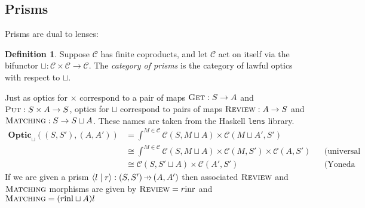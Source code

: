 \documentclass[11pt,a4paper]{article}
\theoremstyle{plain}
\theoremstyle{definition}
\newtheorem{definition}[theorem]{Definition}
\newtheorem{example}[theorem]{Example}
\newcommand{\C}{\mathscr{C}}
\newcommand{\lenslib}{\texttt{lens}}
\newcommand{\Optic}{\mathbf{Optic}}
\newcommand{\inl}{\mathrm{inl}}
\newcommand{\inr}{\mathrm{inr}}
\newcommand{\rep}[2]{{\ensuremath \left\langle #1 \mid #2 \right\rangle}}
\newcommand{\fget}{\textsc{Get}}
\newcommand{\fput}{\textsc{Put}}
\newcommand{\freview}{\textsc{Review}}
\newcommand{\fmatching}{\textsc{Matching}}
\newcommand{\hto}{\ensuremath{\,\mathaccent\shortmid\rightarrow\,}}
\begin{document}

\subsection{Prisms}
Prisms are dual to lenses:

\begin{definition}
  Suppose $\C$ has finite coproducts, and let $\C$ act on itself via the bifunctor $\sqcup : \C \times \C \to \C$. The \emph{category of prisms} is the category of lawful optics with respect to $\sqcup$.
\end{definition}

Just as optics for $\times$ correspond to a pair of maps $\fget : S \to A$ and $\fput : S \times A \to S$, optics for $\sqcup$ correspond to pairs of maps $\freview : A \to S$ and $\fmatching : S \to S \sqcup A$. These names are taken from the Haskell \lenslib{} library.
\begin{align*}
  \Optic_\sqcup((S, S'), (A, A')) &= \int^{M \in \C} \C(S, M \sqcup A) \times \C(M \sqcup A', S') \\
                                  &\cong \int^{M \in \C} \C(S, M \sqcup A) \times \C(M, S') \times \C(A, S') && \text{(universal property of coproduct)} \\
                                  &\cong \C(S, S' \sqcup A) \times \C(A', S') && \text{(Yoneda reduction)}
\end{align*}
If we are given a prism $\rep{l}{r } : (S, S') \hto (A, A')$ then associated $\freview$ and $\fmatching$ morphisms are given by $\freview = r \inr$ and $\fmatching = (r\inl \sqcup A)l$
\end{document}
